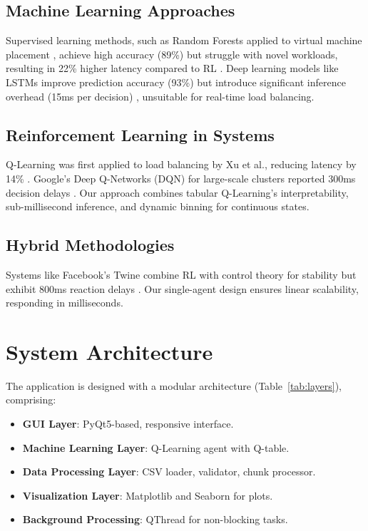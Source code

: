 \documentclass[runningheads]{llncs}
\begin{document}
\subsection{Machine Learning Approaches}\label{machine-learning-approaches}
Supervised learning methods, such as Random Forests applied to virtual machine placement \cite{liu2019}, achieve high accuracy (89\%) but struggle with novel workloads, resulting in 22\% higher latency compared to RL \cite{liu2019}. Deep learning models like LSTMs improve prediction accuracy (93\%) but introduce significant inference overhead (15ms per decision) \cite{zhang2020}, unsuitable for real-time load balancing.

\subsection{Reinforcement Learning in Systems}\label{reinforcement-learning-in-systems}
Q-Learning was first applied to load balancing by Xu et al., reducing latency by 14\% \cite{coffman1998}. Google’s Deep Q-Networks (DQN) for large-scale clusters reported 300ms decision delays \cite{google2021}. Our approach combines tabular Q-Learning’s interpretability, sub-millisecond inference, and dynamic binning for continuous states.

\subsection{Hybrid Methodologies}\label{hybrid-methodologies}
Systems like Facebook’s Twine combine RL with control theory for stability but exhibit 800ms reaction delays \cite{facebook2022}. Our single-agent design ensures linear scalability, responding in milliseconds.

\section{System Architecture}\label{system-architecture}
The application is designed with a modular architecture (Table~\ref{tab:layers}), comprising:
\begin{itemize}
    \item \textbf{GUI Layer}: PyQt5-based, responsive interface.
    \item \textbf{Machine Learning Layer}: Q-Learning agent with Q-table.
    \item \textbf{Data Processing Layer}: CSV loader, validator, chunk processor.
    \item \textbf{Visualization Layer}: Matplotlib and Seaborn for plots.
    \item \textbf{Background Processing}: QThread for non-blocking tasks.
\end{itemize}
\end{document}
